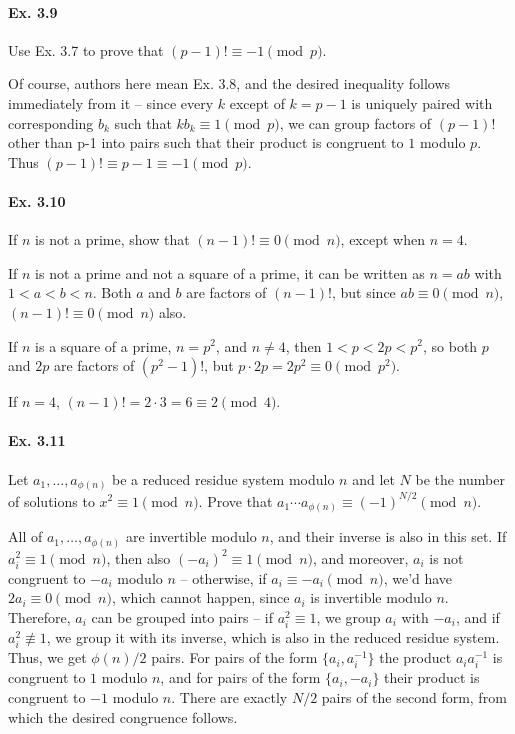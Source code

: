 \documentclass[notitlepage]{article}
\theoremstyle{definition}
\begin{document}
\paragraph{Ex. 3.9}
Use Ex. 3.7 to prove that $(p - 1)! \equiv -1 \pmod p$.

Of course, authors here mean Ex. 3.8, and the desired inequality
follows immediately from it -- since every $k$ except of $k = p-1$ is
uniquely paired with corresponding $b_k$ such that $k b_k \equiv 1
\pmod p$, we can group factors of $(p-1)!$ other than p-1 into pairs
such that their product is congruent to $1$ modulo $p$. Thus $(p-1)!
\equiv p-1 \equiv -1 \pmod p$.

\paragraph{Ex. 3.10}
If $n$ is not a prime, show that $(n - 1)! \equiv 0 \pmod n$, except
when $n = 4$.

If $n$ is not a prime and not a square of a prime, it can be written
as $n = a b$ with $1 < a < b < n$. Both $a$ and $b$ are factors of
$(n-1)!$, but since $ab \equiv 0 \pmod n$, $(n-1)! \equiv 0 \pmod n$
also.

If $n$ is a square of a prime, $n = p^2$, and $n \ne 4$, then $1 < p <
2p < p^2$, so both $p$ and $2p$ are factors of $(p^2 - 1)!$, but $p
\cdot 2p = 2p^2 \equiv 0 \pmod {p^2}$.

If $n = 4$, $(n-1)! = 2 \cdot 3 = 6 \equiv 2 \pmod 4$.

\paragraph{Ex. 3.11}
Let $a_1, \ldots, a_{\phi(n)}$ be a reduced residue system modulo $n$
and let $N$ be the number of solutions to $x^2 \equiv 1 \pmod
n$. Prove that $a_1 \cdots a_{\phi(n)} \equiv (-1)^{N/2} \pmod n$.

All of $a_1, \ldots, a_{\phi(n)}$ are invertible modulo $n$, and their
inverse is also in this set. If $a_i^2 \equiv 1 \pmod n$, then also
$(-a_i)^2 \equiv 1 \pmod n$, and moreover, $a_i$ is not congruent to
$-a_i$ modulo $n$ -- otherwise, if $a_i \equiv -a_i \pmod n$, we'd
have $2 a_i \equiv 0 \pmod n$, which cannot happen, since $a_i$ is
invertible modulo $n$. Therefore, $a_i$ can be grouped into pairs --
if $a_i^2 \equiv 1$, we group $a_i$ with $-a_i$, and if $a_i^2 \not
\equiv 1$, we group it with its inverse, which is also in the reduced
residue system. Thus, we get $\phi(n)/2$ pairs. For pairs of the form
$\{a_i, a_i^{-1}\}$ the product $a_i a_i^{-1}$ is congruent to $1$
modulo $n$, and for pairs of the form $\{a_i, -a_i\}$ their product
is congruent to $-1$ modulo $n$. There are exactly $N/2$ pairs of the
second form, from which the desired congruence follows.
\end{document}
